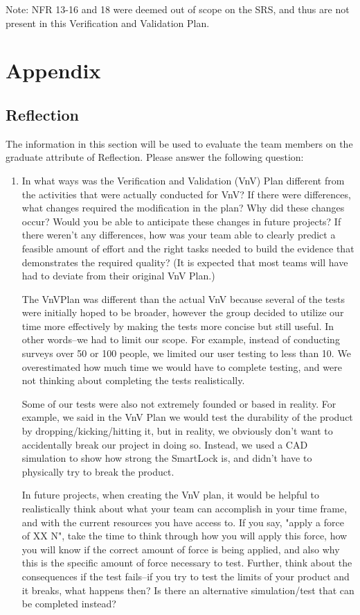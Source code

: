 \documentclass[12pt, titlepage]{article}
\begin{document}
Note: NFR 13-16 and 18 were deemed out of scope on the SRS, and thus are not present in this Verification and Validation Plan. 





\newpage{}
\section{Appendix}
\subsection{Reflection}

The information in this section will be used to evaluate the team members on the
graduate attribute of Reflection.  Please answer the following question:

\begin{enumerate}
  \item In what ways was the Verification and Validation (VnV) Plan different
  from the activities that were actually conducted for VnV?  If there were
  differences, what changes required the modification in the plan?  Why did
  these changes occur?  Would you be able to anticipate these changes in future
  projects?  If there weren't any differences, how was your team able to clearly
  predict a feasible amount of effort and the right tasks needed to build the
  evidence that demonstrates the required quality?  (It is expected that most
  teams will have had to deviate from their original VnV Plan.)
  
  The VnVPlan was different than the actual VnV because several of the tests were initially hoped to be broader, however the group decided to utilize our time more effectively by making the tests more concise but still useful. In other words--we had to limit our scope. For example, instead of conducting surveys over 50 or 100 people, we limited our user testing to less than 10. We overestimated how much time we would have to complete testing, and were not thinking about completing the tests realistically. 

Some of our tests were also not extremely founded or based in reality. For example, we said in the VnV Plan we would test the durability of the product by dropping/kicking/hitting it, but in reality, we obviously don't want to accidentally break our project in doing so. Instead, we used a CAD simulation to show how strong the SmartLock is, and didn't have to physically try to break the product. 

In future projects, when creating the VnV plan, it would be helpful to realistically think about what your team can accomplish in your time frame, and with the current resources you have access to. If you say, "apply a force of XX N", take the time to think through how you will apply this force, how you will know if the correct amount of force is being applied, and also why this is the specific amount of force necessary to test. Further, think about the consequences if the test fails--if you try to test the limits of your product and it breaks, what happens then? Is there an alternative simulation/test that can be completed instead?
\end{enumerate}
\end{document}
